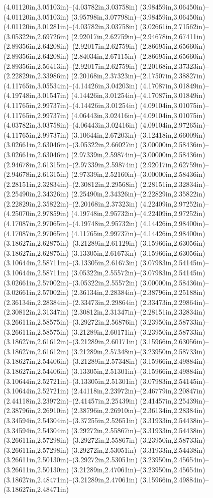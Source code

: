 (4.01120in,3.05103in)--(4.03782in,3.03758in) (3.98459in,3.06450in)--(4.01120in,3.05103in) (3.95798in,3.07798in)--(3.98459in,3.06450in) (4.01120in,3.01281in)--(4.03782in,3.03758in) (3.02661in,2.71562in)--(3.05322in,2.69726in) (2.92017in,2.62759in)--(2.94678in,2.67411in) (2.89356in,2.64208in)--(2.92017in,2.62759in) (2.86695in,2.65660in)--(2.89356in,2.64208in) (2.84034in,2.67115in)--(2.86695in,2.65660in) (2.89356in,2.56413in)--(2.92017in,2.62759in) (2.20168in,2.37323in)--(2.22829in,2.33986in) (2.20168in,2.37323in)--(2.17507in,2.38827in) (4.11765in,3.05534in)--(4.14426in,3.04203in) (4.17087in,3.01849in)--(4.19748in,3.01547in) (4.14426in,3.01254in)--(4.17087in,3.01849in) (4.11765in,2.99737in)--(4.14426in,3.01254in) (4.09104in,3.01075in)--(4.11765in,2.99737in) (4.06443in,3.02416in)--(4.09104in,3.01075in) (4.03782in,3.03758in)--(4.06443in,3.02416in) (4.09104in,2.97265in)--(4.11765in,2.99737in) (3.10644in,2.67203in)--(3.12418in,2.66009in) (3.02661in,2.63046in)--(3.05322in,2.66027in) (3.00000in,2.58436in)--(3.02661in,2.63046in) (2.97339in,2.59874in)--(3.00000in,2.58436in) (2.94678in,2.61315in)--(2.97339in,2.59874in) (2.92017in,2.62759in)--(2.94678in,2.61315in) (2.97339in,2.52160in)--(3.00000in,2.58436in) (2.28151in,2.32834in)--(2.30812in,2.29568in) (2.28151in,2.32834in)--(2.25490in,2.34326in) (2.25490in,2.34326in)--(2.22829in,2.35822in) (2.22829in,2.35822in)--(2.20168in,2.37323in) (4.22409in,2.97252in)--(4.25070in,2.97859in) (4.19748in,2.95732in)--(4.22409in,2.97252in) (4.17087in,2.97065in)--(4.19748in,2.95732in) (4.14426in,2.98400in)--(4.17087in,2.97065in) (4.11765in,2.99737in)--(4.14426in,2.98400in) (3.18627in,2.62875in)--(3.21289in,2.61129in) (3.15966in,2.63056in)--(3.18627in,2.62875in) (3.13305in,2.61673in)--(3.15966in,2.63056in) (3.10644in,2.58711in)--(3.13305in,2.61673in) (3.07983in,2.54145in)--(3.10644in,2.58711in) (3.05322in,2.55572in)--(3.07983in,2.54145in) (3.02661in,2.57002in)--(3.05322in,2.55572in) (3.00000in,2.58436in)--(3.02661in,2.57002in) (2.36134in,2.28384in)--(2.38796in,2.25188in) (2.36134in,2.28384in)--(2.33473in,2.29864in) (2.33473in,2.29864in)--(2.30812in,2.31347in) (2.30812in,2.31347in)--(2.28151in,2.32834in) (3.26611in,2.58575in)--(3.29272in,2.56876in) (3.23950in,2.58733in)--(3.26611in,2.58575in) (3.21289in,2.60171in)--(3.23950in,2.58733in) (3.18627in,2.61612in)--(3.21289in,2.60171in) (3.15966in,2.63056in)--(3.18627in,2.61612in) (3.21289in,2.57348in)--(3.23950in,2.58733in) (3.18627in,2.54406in)--(3.21289in,2.57348in) (3.15966in,2.49884in)--(3.18627in,2.54406in) (3.13305in,2.51301in)--(3.15966in,2.49884in) (3.10644in,2.52721in)--(3.13305in,2.51301in) (3.07983in,2.54145in)--(3.10644in,2.52721in) (2.44118in,2.23972in)--(2.46779in,2.20847in) (2.44118in,2.23972in)--(2.41457in,2.25439in) (2.41457in,2.25439in)--(2.38796in,2.26910in) (2.38796in,2.26910in)--(2.36134in,2.28384in) (3.34594in,2.54304in)--(3.37255in,2.52651in) (3.31933in,2.54438in)--(3.34594in,2.54304in) (3.29272in,2.55867in)--(3.31933in,2.54438in) (3.26611in,2.57298in)--(3.29272in,2.55867in) (3.23950in,2.58733in)--(3.26611in,2.57298in) (3.29272in,2.53051in)--(3.31933in,2.54438in) (3.26611in,2.50130in)--(3.29272in,2.53051in) (3.23950in,2.45654in)--(3.26611in,2.50130in) (3.21289in,2.47061in)--(3.23950in,2.45654in) (3.18627in,2.48471in)--(3.21289in,2.47061in) (3.15966in,2.49884in)--(3.18627in,2.48471in) 